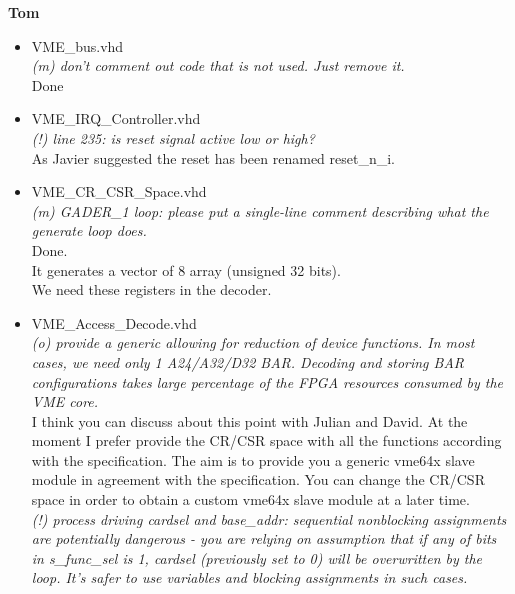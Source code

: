 \documentclass[a4paper,11pt]{article}
\begin{document}
\begin{center}
\LARGE{\textbf{Tom}}
\end{center}
\begin{itemize}
\item VME\_bus.vhd\\
\textit{(m) don't comment out code that is not used. Just remove it.}\\
Done
\item VME\_IRQ\_Controller.vhd\\
\textit {(!) line 235: is reset signal active low or high?}\\
As Javier suggested the reset has been renamed reset\_n\_i.
\item VME\_CR\_CSR\_Space.vhd\\
\textit{(m) GADER\_1 loop: please put a single-line comment describing what the generate loop does.}\\
Done.\\
It generates a vector of 8 array (unsigned 32 bits).\\
We need these registers in the decoder.
\item VME\_Access\_Decode.vhd\\

\textit {(o) provide a generic allowing for reduction of device functions. In most cases, we need only 1 A24/A32/D32 BAR.
  Decoding and storing BAR configurations takes large percentage of the FPGA resources consumed by the VME core.}\\

I think you can discuss about this point with Julian and David. At the moment I prefer provide the CR/CSR space with all the
functions according with the specification. The aim is to provide you a generic vme64x slave module in agreement with the 
specification. You can change the CR/CSR space in order to obtain a custom vme64x slave module at a later time.\\

\textit {(!) process driving cardsel and base\_addr: sequential nonblocking assignments are potentially
  dangerous - you are relying on assumption that if any of bits in s\_func\_sel is 1, cardsel (previously set
  to 0) will be overwritten by the loop. It's safer to use variables and blocking assignments in such cases.}\\


\end{itemize}
\end{document}

